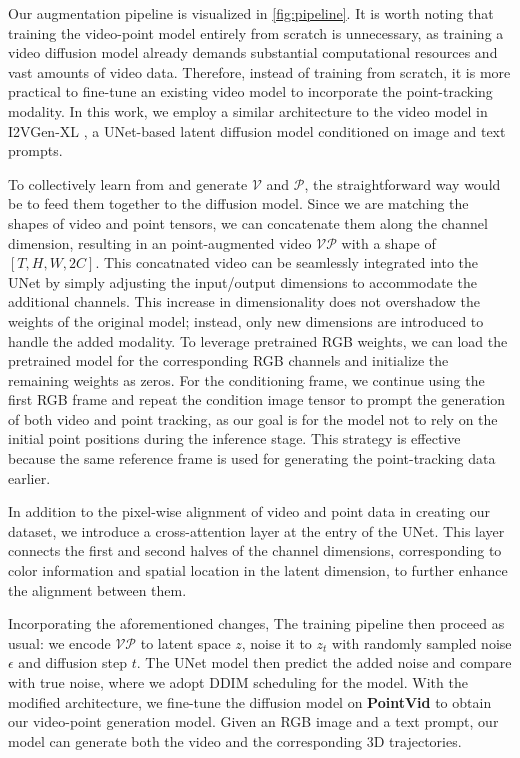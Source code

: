 Our augmentation pipeline is visualized in \autoref{fig:pipeline}. It is worth noting that training the video-point model entirely from scratch is unnecessary, as training a video diffusion model already demands substantial computational resources and vast amounts of video data. Therefore, instead of training from scratch, it is more practical to fine-tune an existing video model to incorporate the point-tracking modality. In this work, we employ a similar architecture to the video model in I2VGen-XL \cite{zhang2023i2vgen, wang2023modelscope}, a UNet-based latent diffusion model conditioned on image and text prompts. 

To collectively learn from and generate $\mathcal{V}$ and $\mathcal{P}$, the straightforward way would be to feed them together to the diffusion model. Since we are matching the shapes of video and point tensors, we can concatenate them along the channel dimension, resulting in an point-augmented video $\mathcal{VP}$ with a shape of $[T, H, W, 2C]$. This concatnated video can be seamlessly integrated into the UNet by simply adjusting the input/output dimensions to accommodate the additional channels. 
This increase in dimensionality does not overshadow the weights of the original model; instead, only new dimensions are introduced to handle the added modality. To leverage pretrained RGB weights, we can load the pretrained model for the corresponding RGB channels and initialize the remaining weights as zeros. For the conditioning frame, we continue using the first RGB frame and repeat the condition image tensor to prompt the generation of both video and point tracking, as our goal is for the model not to rely on the initial point positions during the inference stage. This strategy is effective because the same reference frame is used for generating the point-tracking data earlier.

In addition to the pixel-wise alignment of video and point data in creating our dataset, we introduce a cross-attention layer at the entry of the UNet. This layer connects the first and second halves of the channel dimensions, corresponding to color information and spatial location in the latent dimension, to further enhance the alignment between them.

Incorporating the aforementioned changes, The training pipeline then proceed as usual: we encode $\mathcal{VP}$ to latent space $z$, noise it to $z_t$ with randomly sampled noise $\epsilon$ and diffusion step $t$. The UNet model then predict the added noise and compare with true noise, where we adopt DDIM scheduling for the model. With the modified architecture, we fine-tune the diffusion model on \textbf{PointVid} to obtain our video-point generation model. Given an RGB image and a text prompt, our model can generate both the video and the corresponding 3D trajectories.






